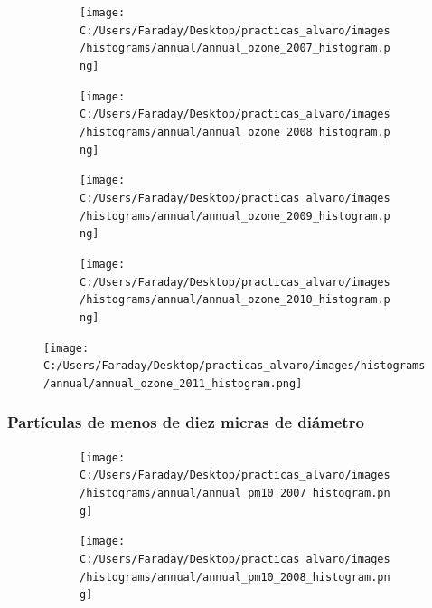 \documentclass[12pt]{article}
\begin{document}
\begin{figure}[H]
\centering
\begin{subfigure}[h]{0.45\textwidth}
\texttt{[image: C:/Users/Faraday/Desktop/practicas\_alvaro/images/histograms/annual/annual\_ozone\_2007\_histogram.png]}
\caption{}
\label{fig:hist-ann-2-1}
\end{subfigure}
%
\begin{subfigure}[H]{0.45\textwidth}
\texttt{[image: C:/Users/Faraday/Desktop/practicas\_alvaro/images/histograms/annual/annual\_ozone\_2008\_histogram.png]}
\caption{}
\label{fig:hist-ann-2-2}
\end{subfigure}
\caption{}
\end{figure}

\begin{figure}[H]
\centering
\begin{subfigure}[h]{0.45\textwidth}
\texttt{[image: C:/Users/Faraday/Desktop/practicas\_alvaro/images/histograms/annual/annual\_ozone\_2009\_histogram.png]}
\caption{}
\label{fig:hist-ann-2-3}
\end{subfigure}
%
\begin{subfigure}[H]{0.45\textwidth}
\texttt{[image: C:/Users/Faraday/Desktop/practicas\_alvaro/images/histograms/annual/annual\_ozone\_2010\_histogram.png]}
\caption{}
\label{fig:hist-ann-2-4}
\end{subfigure}
\caption{}
\end{figure}

\begin{figure}[H]
\centering
\texttt{[image: C:/Users/Faraday/Desktop/practicas\_alvaro/images/histograms/annual/annual\_ozone\_2011\_histogram.png]}
\label{fig:hist-ann-2-5}
\caption{}
\end{figure}

\newpage

\subsubsection*{Partículas de menos de diez micras de diámetro}
%

\begin{figure}[H]
\centering
\begin{subfigure}[h]{0.45\textwidth}
\texttt{[image: C:/Users/Faraday/Desktop/practicas\_alvaro/images/histograms/annual/annual\_pm10\_2007\_histogram.png]}
\caption{}
\label{fig:hist-ann-3-1}
\end{subfigure}
%
\begin{subfigure}[H]{0.45\textwidth}
\texttt{[image: C:/Users/Faraday/Desktop/practicas\_alvaro/images/histograms/annual/annual\_pm10\_2008\_histogram.png]}
\caption{}
\label{fig:hist-ann-3-2}
\end{subfigure}
\caption{}
\end{figure}
\end{document}
